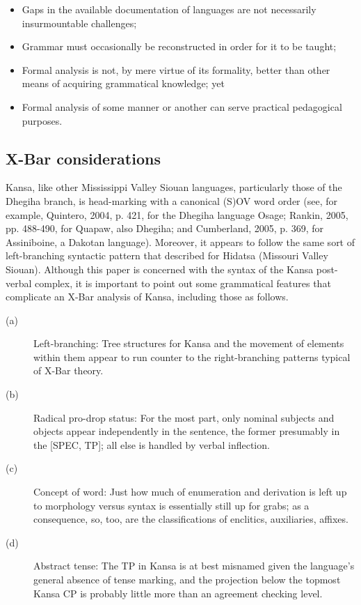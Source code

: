 \documentclass[output=paper]{LSP/langsci}
\begin{document}
\begin{itemize}
\item Gaps in the available documentation of languages are not necessarily insurmountable challenges;
\item Grammar must occasionally be reconstructed in order for it to be taught;
\item Formal analysis is not, by mere virtue of its formality, better than other means of acquiring grammatical knowledge; yet
\item Formal analysis of some manner or another can serve practical pedagogical purposes.
\end{itemize}

\subsection{X-Bar considerations}
Kansa, like other Mississippi Valley Siouan languages, particularly those of the Dhegiha branch, is head-marking with a canonical (S)OV word order (see, for example, Quintero, 2004, p. 421, for the Dhegiha language Osage; Rankin, 2005, pp. 488-490, for Quapaw, also Dhegiha; and Cumberland, 2005, p. 369, for Assiniboine, a Dakotan language). Moreover, it appears to follow the same sort of left-branching syntactic pattern that \citet{Boyle2007} described for Hidatsa (Missouri Valley Siouan). Although this paper is concerned with the syntax of the Kansa post-verbal complex, it is important to point out some grammatical features that complicate an X-Bar analysis of Kansa, including those as follows.

\begin{description}
\item[(a)]	Left-branching: Tree structures for Kansa and the movement of elements within them appear to run counter to the right-branching patterns typical of X-Bar theory.

\item[(b)]	Radical pro-drop status: For the most part, only nominal subjects and objects appear independently in the sentence, the former presumably in the [SPEC, TP]; all else is handled by verbal inflection. 

\item[(c)]	Concept of word: Just how much of enumeration and derivation is left up to morphology versus syntax is essentially still up for grabs; as a consequence, so, too, are the classifications of enclitics, auxiliaries, affixes. 

\item[(d)]	Abstract tense: The TP in Kansa is at best misnamed given the language's general absence of tense marking, and the projection below the topmost Kansa CP is probably little more than an agreement checking level.
\end{description}
\end{document}
